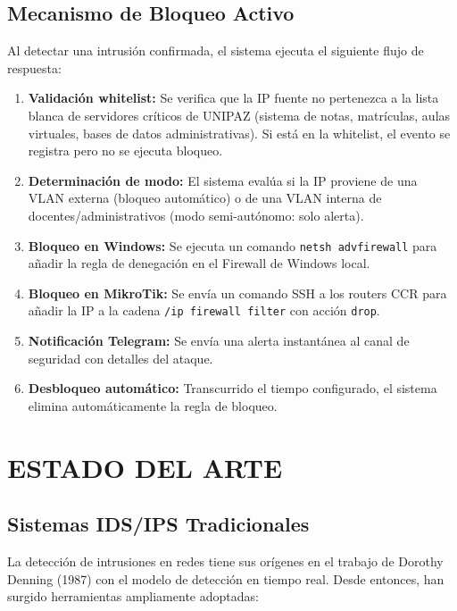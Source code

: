 \documentclass[12pt, letterpaper, oneside]{report}
\begin{document}
\section{Mecanismo de Bloqueo Activo}

Al detectar una intrusión confirmada, el sistema ejecuta el siguiente flujo de respuesta:

\begin{enumerate}[leftmargin=*]
  \item \textbf{Validación whitelist:} Se verifica que la IP fuente no pertenezca a la lista blanca de servidores críticos de UNIPAZ (sistema de notas, matrículas, aulas virtuales, bases de datos administrativas). Si está en la whitelist, el evento se registra pero no se ejecuta bloqueo.
  \item \textbf{Determinación de modo:} El sistema evalúa si la IP proviene de una VLAN externa (bloqueo automático) o de una VLAN interna de docentes/administrativos (modo semi-autónomo: solo alerta).
  \item \textbf{Bloqueo en Windows:} Se ejecuta un comando \texttt{netsh advfirewall} para añadir la regla de denegación en el Firewall de Windows local.
  \item \textbf{Bloqueo en MikroTik:} Se envía un comando SSH a los routers CCR para añadir la IP a la cadena \texttt{/ip firewall filter} con acción \texttt{drop}.
  \item \textbf{Notificación Telegram:} Se envía una alerta instantánea al canal de seguridad con detalles del ataque.
  \item \textbf{Desbloqueo automático:} Transcurrido el tiempo configurado, el sistema elimina automáticamente la regla de bloqueo.
\end{enumerate}

\chapter{ESTADO DEL ARTE}

\section{Sistemas IDS/IPS Tradicionales}

La detección de intrusiones en redes tiene sus orígenes en el trabajo de Dorothy Denning (1987) con el modelo de detección en tiempo real. Desde entonces, han surgido herramientas ampliamente adoptadas:
\end{document}
